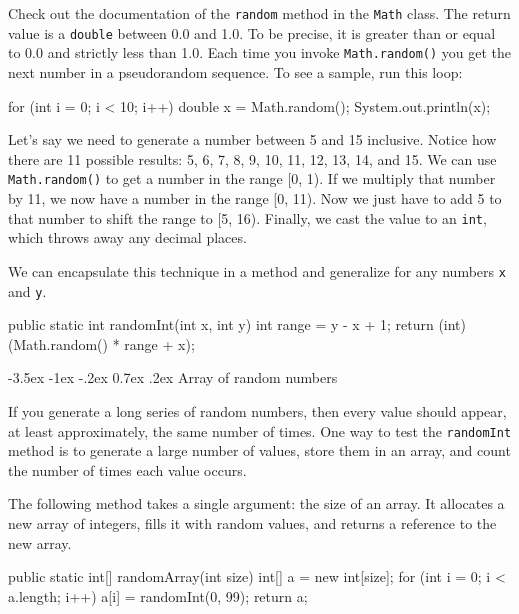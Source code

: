 \documentclass[12pt]{book}
\makeatletter
\theoremstyle{exercise}
\newcommand{\java}[1]{\verb"#1"}
\renewcommand{\section}{\@startsection {section}{1}{\z@}%
    {-3.5ex \@plus -1ex \@minus -.2ex}%
    {0.7ex \@plus.2ex}%
    {\normalfont\Large\bfseries}}
\newcommand{\java}[1]{\lstinline{#1}} %
\makeatother
\begin{document}

Check out the documentation of the \java{random} method in the \java{Math} class.
The return value is a \java{double} between 0.0 and 1.0.
To be precise, it is greater than or equal to 0.0 and strictly less than 1.0.
Each time you invoke \java{Math.random()} you get the next number in a pseudorandom sequence.
To see a sample, run this loop:

\begin{code}
    for (int i = 0; i < 10; i++) {
        double x = Math.random();
        System.out.println(x);
    }
\end{code}

Let's say we need to generate a number between 5 and 15 inclusive.
Notice how there are 11 possible results: 5, 6, 7, 8, 9, 10, 11, 12, 13, 14, and 15.
We can use \java{Math.random()} to get a number in the range [0, 1).
If we multiply that number by 11, we now have a number in the range [0, 11).
Now we just have to add 5 to that number to shift the range to [5, 16).
Finally, we cast the value to an \java{int}, which throws away any decimal places.

We can encapsulate this technique in a method and generalize for any numbers \java{x} and \java{y}.

\begin{code}
    public static int randomInt(int x, int y) {
        int range = y - x + 1;
        return (int) (Math.random() * range + x);
    }
\end{code}



\section{Array of random numbers}
\label{randarray}

If you generate a long series of random numbers, then every value should appear, at least approximately, the same number of times.
One way to test the \java{randomInt} method is to generate a large number of values, store them in an array, and count the number of times each value occurs.

The following method takes a single argument: the size of an array.
It allocates a new array of integers, fills it with random values, and returns a reference to the new array.

\begin{code}
    public static int[] randomArray(int size) {
      int[] a = new int[size];
      for (int i = 0; i < a.length; i++) {
          a[i] = randomInt(0, 99);
      }
      return a;
  }
\end{code}
\end{document}
